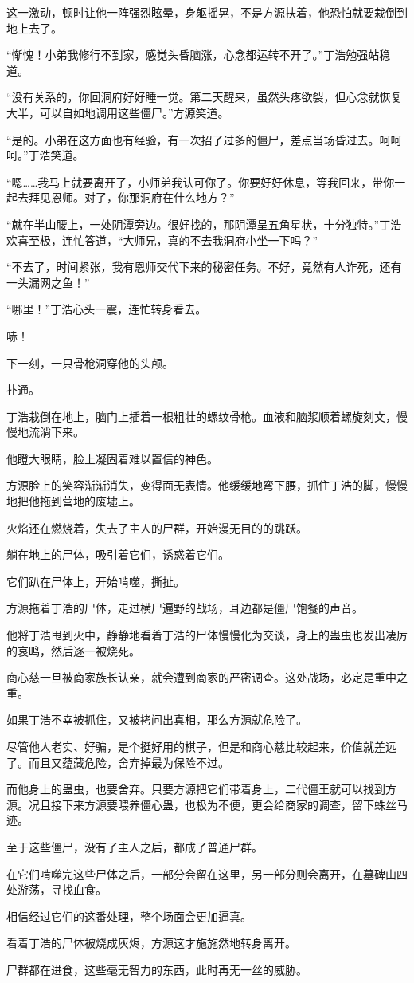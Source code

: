 \begin{this_body}
这一激动，顿时让他一阵强烈眩晕，身躯摇晃，不是方源扶着，他恐怕就要栽倒到地上去了。

“惭愧！小弟我修行不到家，感觉头昏脑涨，心念都运转不开了。”丁浩勉强站稳道。

“没有关系的，你回洞府好好睡一觉。第二天醒来，虽然头疼欲裂，但心念就恢复大半，可以自如地调用这些僵尸。”方源笑道。

“是的。小弟在这方面也有经验，有一次招了过多的僵尸，差点当场昏过去。呵呵呵。”丁浩笑道。

“嗯……我马上就要离开了，小师弟我认可你了。你要好好休息，等我回来，带你一起去拜见恩师。对了，你那洞府在什么地方？”

“就在半山腰上，一处阴潭旁边。很好找的，那阴潭呈五角星状，十分独特。”丁浩欢喜至极，连忙答道，“大师兄，真的不去我洞府小坐一下吗？”

“不去了，时间紧张，我有恩师交代下来的秘密任务。不好，竟然有人诈死，还有一头漏网之鱼！”

“哪里！”丁浩心头一震，连忙转身看去。

哧！

下一刻，一只骨枪洞穿他的头颅。

扑通。

丁浩栽倒在地上，脑门上插着一根粗壮的螺纹骨枪。血液和脑浆顺着螺旋刻文，慢慢地流淌下来。

他瞪大眼睛，脸上凝固着难以置信的神色。

方源脸上的笑容渐渐消失，变得面无表情。他缓缓地弯下腰，抓住丁浩的脚，慢慢地把他拖到营地的废墟上。

火焰还在燃烧着，失去了主人的尸群，开始漫无目的的跳跃。

躺在地上的尸体，吸引着它们，诱惑着它们。

它们趴在尸体上，开始啃噬，撕扯。

方源拖着丁浩的尸体，走过横尸遍野的战场，耳边都是僵尸饱餐的声音。

他将丁浩甩到火中，静静地看着丁浩的尸体慢慢化为交谈，身上的蛊虫也发出凄厉的哀鸣，然后逐一被烧死。

商心慈一旦被商家族长认亲，就会遭到商家的严密调查。这处战场，必定是重中之重。

如果丁浩不幸被抓住，又被拷问出真相，那么方源就危险了。

尽管他人老实、好骗，是个挺好用的棋子，但是和商心慈比较起来，价值就差远了。而且又蕴藏危险，舍弃掉最为保险不过。

而他身上的蛊虫，也要舍弃。只要方源把它们带着身上，二代僵王就可以找到方源。况且接下来方源要喂养僵心蛊，也极为不便，更会给商家的调查，留下蛛丝马迹。

至于这些僵尸，没有了主人之后，都成了普通尸群。

在它们啃噬完这些尸体之后，一部分会留在这里，另一部分则会离开，在墓碑山四处游荡，寻找血食。

相信经过它们的这番处理，整个场面会更加逼真。

看着丁浩的尸体被烧成灰烬，方源这才施施然地转身离开。

尸群都在进食，这些毫无智力的东西，此时再无一丝的威胁。

\end{this_body}

